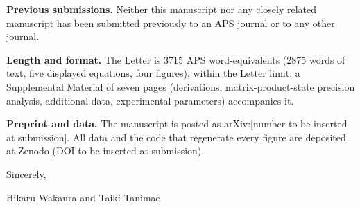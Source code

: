 \documentclass[11pt]{article}
\begin{document}
\medskip
\noindent\textbf{Previous submissions.} Neither this manuscript nor any closely related manuscript has been submitted previously to an APS journal or to any other journal.

\medskip
\noindent\textbf{Length and format.} The Letter is 3715 APS word-equivalents (2875 words of text, five displayed equations, four figures), within the Letter limit; a Supplemental Material of seven pages (derivations, matrix-product-state precision analysis, additional data, experimental parameters) accompanies it.

\medskip
\noindent\textbf{Preprint and data.} The manuscript is posted as arXiv:[number to be inserted at submission]. All data and the code that regenerate every figure are deposited at Zenodo (DOI to be inserted at submission).

\medskip
\noindent Sincerely,

\medskip
\noindent Hikaru Wakaura and Taiki Tanimae
\end{document}
